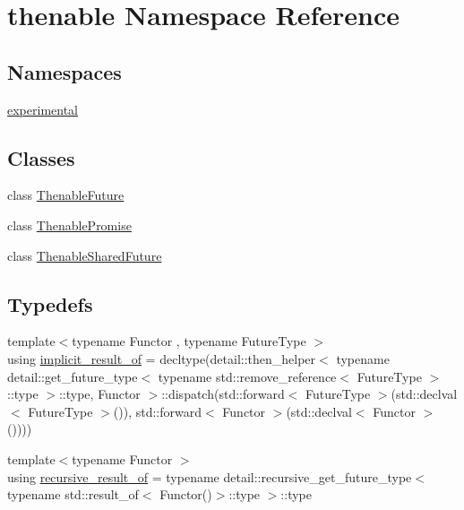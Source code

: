 \hypertarget{namespacethenable}{}\section{thenable Namespace Reference}
\label{namespacethenable}
\subsection*{Namespaces}
\begin{DoxyCompactItemize}
\item 
 \hyperlink{namespacethenable_1_1experimental}{experimental}
\end{DoxyCompactItemize}
\subsection*{Classes}
\begin{DoxyCompactItemize}
\item 
class \hyperlink{classthenable_1_1_thenable_future}{Thenable\+Future}
\item 
class \hyperlink{classthenable_1_1_thenable_promise}{Thenable\+Promise}
\item 
class \hyperlink{classthenable_1_1_thenable_shared_future}{Thenable\+Shared\+Future}
\end{DoxyCompactItemize}
\subsection*{Typedefs}
\begin{DoxyCompactItemize}
\item 
{\footnotesize template$<$typename Functor , typename Future\+Type $>$ }\\using \hyperlink{namespacethenable_a1ecf08d6ad8b8688d7b4df047b5feaae}{implicit\+\_\+result\+\_\+of} = decltype(detail\+::then\+\_\+helper$<$ typename detail\+::get\+\_\+future\+\_\+type$<$ typename std\+::remove\+\_\+reference$<$ Future\+Type $>$\+::type $>$\+::type, Functor $>$\+::dispatch(std\+::forward$<$ Future\+Type $>$(std\+::declval$<$ Future\+Type $>$()), std\+::forward$<$ Functor $>$(std\+::declval$<$ Functor $>$())))
\item 
{\footnotesize template$<$typename Functor $>$ }\\using \hyperlink{namespacethenable_ae5c96f83512d34d52e355cacdec0eb02}{recursive\+\_\+result\+\_\+of} = typename detail\+::recursive\+\_\+get\+\_\+future\+\_\+type$<$ typename std\+::result\+\_\+of$<$ Functor()$>$\+::type $>$\+::type
\end{DoxyCompactItemize}

